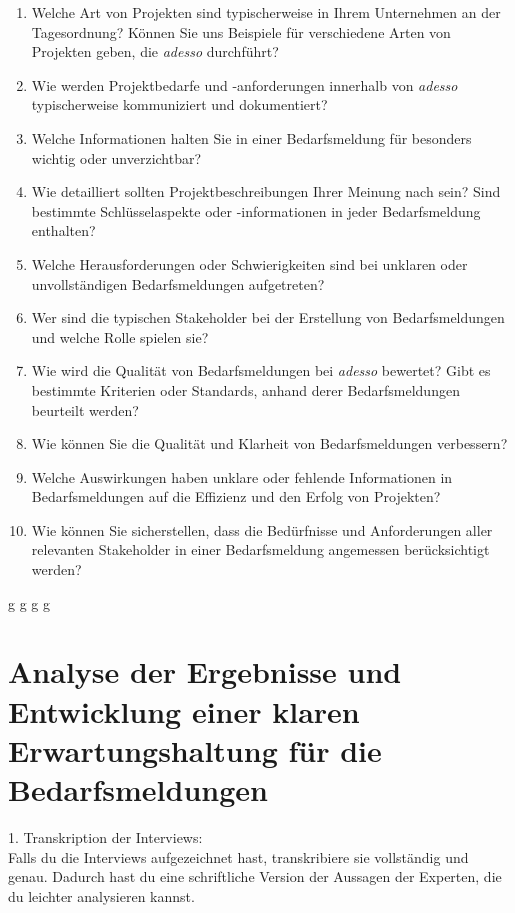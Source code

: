 \begin{enumerate}
	\item Welche Art von Projekten sind typischerweise in Ihrem Unternehmen an der Tagesordnung? Können Sie uns Beispiele für verschiedene Arten von Projekten geben, die \emph{adesso} durchführt?
	\item Wie werden Projektbedarfe und -anforderungen innerhalb von \emph{adesso} typischerweise kommuniziert und dokumentiert?
	\item Welche Informationen halten Sie in einer Bedarfsmeldung für besonders wichtig oder unverzichtbar?
	\item Wie detailliert sollten Projektbeschreibungen Ihrer Meinung nach sein? Sind bestimmte Schlüsselaspekte oder -informationen in jeder Bedarfsmeldung enthalten?
	\item Welche Herausforderungen oder Schwierigkeiten sind bei unklaren oder unvollständigen Bedarfsmeldungen aufgetreten?
	\item Wer sind die typischen Stakeholder bei der Erstellung von Bedarfsmeldungen und welche Rolle spielen sie?
	\item Wie wird die Qualität von Bedarfsmeldungen bei \emph{adesso} bewertet? Gibt es bestimmte Kriterien oder Standards, anhand derer Bedarfsmeldungen beurteilt werden?
	\item Wie können Sie die Qualität und Klarheit von Bedarfsmeldungen verbessern?
	\item Welche Auswirkungen haben unklare oder fehlende Informationen in Bedarfsmeldungen auf die Effizienz und den Erfolg von Projekten?
	\item Wie können Sie sicherstellen, dass die Bedürfnisse und Anforderungen aller relevanten Stakeholder in einer Bedarfsmeldung angemessen berücksichtigt werden?
\end{enumerate}
\newpage
g
\newpage
g
\newpage
g
\newpage
g
\newpage

\section{Analyse der Ergebnisse und Entwicklung einer klaren Erwartungshaltung für die Bedarfsmeldungen}

1. Transkription der Interviews:\\
Falls du die Interviews aufgezeichnet hast, transkribiere sie vollständig und genau. Dadurch hast du eine schriftliche Version der Aussagen der Experten, die du leichter analysieren kannst.\\

